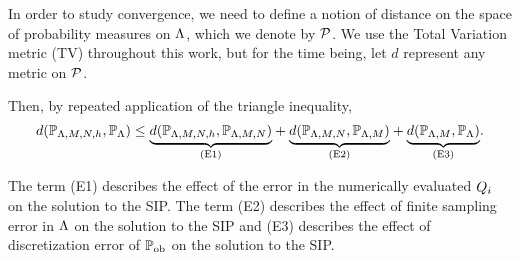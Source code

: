 In order to study convergence, we need to define a notion of distance on the space of probability measures on ${\Lambda}$, which we denote by $\mathcal{P}$.
We use the Total Variation metric (TV) throughout this work, but for the time being, let $d$ represent any metric on $\mathcal{P}$.

Then, by repeated application of the triangle inequality,
\begin{equation}
\label{eq:set-triangleineq}
d(\mathbb{P}_{{\Lambda}, M, N, h}, \mathbb{P}_{\Lambda}) \leq
\underset{ \text{(E1)} }{\underbrace{d(\mathbb{P}_{{\Lambda}, M, N, h},\mathbb{P}_{{\Lambda}, M, N})}} +
\underset{ \text{(E2)} }{\underbrace{d(\mathbb{P}_{{\Lambda}, M, N}, \mathbb{P}_{{\Lambda}, M}) }}+
\underset{ \text{(E3)} }{\underbrace{d(\mathbb{P}_{{\Lambda}, M}, \mathbb{P}_{\Lambda}) }}.
\end{equation}

The term (E1) describes the effect of the error in the numerically evaluated $Q_i$ on the solution to the SIP.
The term (E2) describes the effect of finite sampling error in ${\Lambda}$ on the solution to the SIP and (E3) describes the effect of discretization error of $\operatorname*{\mathbb{P}_{ob}}$ on the solution to the SIP.

